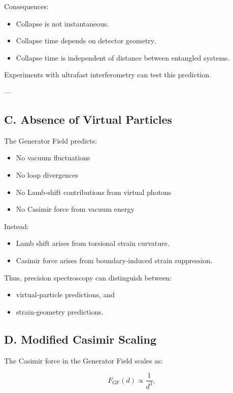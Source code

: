 \documentclass[reprint,amsmath,amssymb,aps,prl,floatfix]{revtex4-2}
\begin{document}
\begin{itemize}
Consequences:

\begin{itemize}
\item Collapse is not instantaneous.  
\item Collapse time depends on detector geometry.  
\item Collapse time is independent of distance between entangled systems.
\end{itemize}

Experiments with ultrafast interferometry can test this prediction.

---

\subsection{C. Absence of Virtual Particles}

The Generator Field predicts:

\begin{itemize}
\item No vacuum fluctuations  
\item No loop divergences  
\item No Lamb‑shift contributions from virtual photons  
\item No Casimir force from vacuum energy
\end{itemize}

Instead:

\begin{itemize}
\item Lamb shift arises from torsional strain curvature.  
\item Casimir force arises from boundary‑induced strain suppression.
\end{itemize}

Thus, precision spectroscopy can distinguish between:

\begin{itemize}
\item virtual‑particle predictions, and  
\item strain‑geometry predictions.
\end{itemize}

\subsection{D. Modified Casimir Scaling}

The Casimir force in the Generator Field scales as:

\[
F_{\mathrm{GF}}(d)
\propto
\frac{1}{d^3},
\]


\end{itemize}
\end{document}
